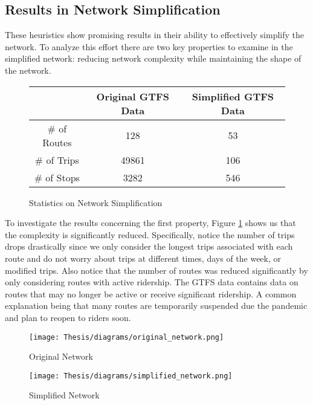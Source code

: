 \documentclass[11pt]{amsart}
\theoremstyle{definition}                  %
\theoremstyle{remark}                       %
\numberwithin{equation}{section}
\begin{document}
\subsection{Results in Network Simplification}
These heuristics show promising results in their ability to effectively simplify the network. To analyze this effort there are two key properties to examine in the simplified network: reducing network complexity while maintaining the shape of the network. 

\begin{figure}[h]
    \centering
    \begin{tabular}{|c|c|c|}
        \hline
         & Original GTFS Data & Simplified GTFS Data \\
         \hline
        \# of Routes & 128 & 53 \\
        \# of Trips & 49861 & 106 \\
        \# of Stops & 3282 & 546 \\
        \hline
    \end{tabular}
    \caption{Statistics on Network Simplification}
    \label{table:num_changes}
\end{figure}

To investigate the results concerning the first property, Figure \ref{table:num_changes} shows us that the complexity is significantly reduced. Specifically, notice the number of trips drops drastically since we only consider the longest trips associated with each route and do not worry about trips at different times, days of the week, or modified trips. Also notice that the number of routes was reduced significantly by only considering routes with active ridership. The GTFS data contains data on routes that may no longer be active or receive significant ridership. A common explanation being that many routes are temporarily suspended due the pandemic and plan to reopen to riders soon. 

\begin{figure}[h]
\centering
\begin{minipage}{.5\textwidth}
  \centering
  \texttt{[image: Thesis/diagrams/original\_network.png]}
  \caption{Original Network}
  \label{fig:original_network}
\end{minipage}%
\begin{minipage}{.5\textwidth}
  \centering
  \texttt{[image: Thesis/diagrams/simplified\_network.png]}
  \caption{Simplified Network}
  \label{fig:simplified_network}
\end{minipage}
\end{figure}
\end{document}
